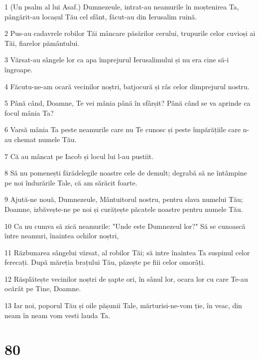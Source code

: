 \par 1 (Un psalm al lui Asaf.) Dumnezeule, intrat-au neamurile în moștenirea Ta, pângărit-au locașul Tău cel sfânt, făcut-au din Ierusalim ruină.
\par 2 Pus-au cadavrele robilor Tăi mâncare păsărilor cerului, trupurile celor cuvioși ai Tăi, fiarelor pământului.
\par 3 Vărsat-au sângele lor ca apa împrejurul Ierusalimului și nu era cine să-i îngroape.
\par 4 Făcutu-ne-am ocară vecinilor noștri, batjocură și râs celor dimprejurul nostru.
\par 5 Până când, Doamne, Te vei mânia până în sfârșit? Până când se va aprinde ca focul mânia Ta?
\par 6 Varsă mânia Ta peste neamurile care nu Te cunosc și peste împărățiile care n-au chemat numele Tău.
\par 7 Că au mâncat pe Iacob și locul lui l-au pustiit.
\par 8 Să nu pomenești fărădelegile noastre cele de demult; degrabă să ne întâmpine pe noi îndurările Tale, că am sărăcit foarte.
\par 9 Ajută-ne nouă, Dumnezeule, Mântuitorul nostru, pentru slava numelui Tău; Doamne, izbăvește-ne pe noi și curățește păcatele noastre pentru numele Tău.
\par 10 Ca nu cumva să zică neamurile: "Unde este Dumnezeul lor?" Să se cunoască între neamuri, înaintea ochilor noștri,
\par 11 Răzbunarea sângelui vărsat, al robilor Tăi; să intre înaintea Ta suspinul celor ferecați. După măreția brațului Tău, păzește pe fiii celor omorâți.
\par 12 Răsplătește vecinilor noștri de șapte ori, în sânul lor, ocara lor cu care Te-au ocărât pe Tine, Doamne.
\par 13 Iar noi, poporul Tău și oile pășunii Tale, mărturisi-ne-vom ție, în veac, din neam în neam vom vesti lauda Ta.

\chapter{80}

